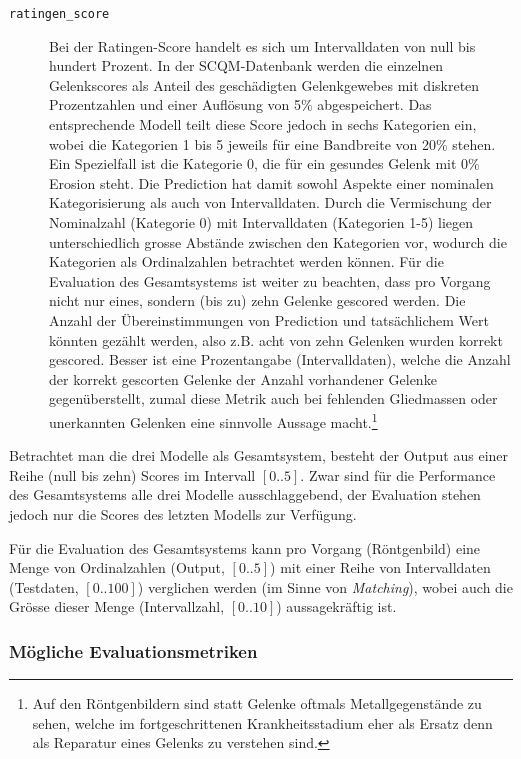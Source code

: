 \begin{description}
    \item[\texttt{ratingen\_score}] Bei der Ratingen-Score handelt es sich um Intervalldaten von null bis hundert Prozent. In der SCQM-Datenbank werden die einzelnen Gelenkscores als Anteil des geschädigten Gelenkgewebes mit diskreten Prozentzahlen und einer Auflösung von 5\% abgespeichert. Das entsprechende Modell teilt diese Score jedoch in sechs Kategorien ein, wobei die Kategorien 1 bis 5 jeweils für eine Bandbreite von 20\% stehen. Ein Spezielfall ist die Kategorie 0, die für ein gesundes Gelenk mit 0\% Erosion steht. Die Prediction hat damit sowohl Aspekte einer nominalen Kategorisierung als auch von Intervalldaten. Durch die Vermischung der Nominalzahl (Kategorie 0) mit Intervalldaten (Kategorien 1-5) liegen unterschiedlich grosse Abstände zwischen den Kategorien vor, wodurch die Kategorien als Ordinalzahlen betrachtet werden können. Für die Evaluation des Gesamtsystems ist weiter zu beachten, dass pro Vorgang nicht nur eines, sondern (bis zu) zehn Gelenke gescored werden. Die Anzahl der Übereinstimmungen von Prediction und tatsächlichem Wert könnten gezählt werden, also z.B. acht von zehn Gelenken wurden korrekt gescored. Besser ist eine Prozentangabe (Intervalldaten), welche die Anzahl der korrekt gescorten Gelenke der Anzahl vorhandener Gelenke gegenüberstellt, zumal diese Metrik auch bei fehlenden Gliedmassen oder unerkannten Gelenken eine sinnvolle Aussage macht.\footnote{Auf den Röntgenbildern sind statt Gelenke oftmals Metallgegenstände zu sehen, welche im fortgeschrittenen Krankheitsstadium eher als Ersatz denn als Reparatur eines Gelenks zu verstehen sind.}
\end{description}

Betrachtet man die drei Modelle als Gesamtsystem, besteht der Output aus einer Reihe (null bis zehn) Scores im Intervall $[0..5]$. Zwar sind für die Performance des Gesamtsystems alle drei Modelle ausschlaggebend, der Evaluation stehen jedoch nur die Scores des letzten Modells zur Verfügung.

Für die Evaluation des Gesamtsystems kann pro Vorgang (Röntgenbild) eine Menge von Ordinalzahlen (Output, $[0..5]$) mit einer Reihe von Intervalldaten (Testdaten, $[0..100]$) verglichen werden (im Sinne von \textit{Matching}), wobei auch die Grösse dieser Menge (Intervallzahl, $[0..10]$) aussagekräftig ist.

\subsubsection{Mögliche Evaluationsmetriken}
\label{sec:evaluationsmetriken}

